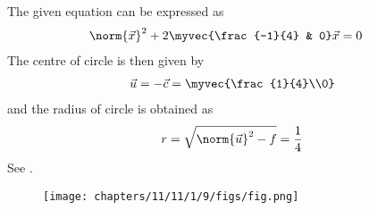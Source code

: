 The given equation can be expressed as 
\begin{align}
\norm{\vec{x}}^2+2\myvec{\frac{-1}{4} & 0}\vec{x}&=0
\end{align}	
The centre of circle is then given by 
\begin{align}
	\vec{u} = -\vec{c} 
=\myvec{\frac{1}{4}\\0}
\end{align}
and the radius of circle is obtained as
\begin{align}
	r=\sqrt{\norm{\vec{u}}^2 -f}
=\frac{1}{4}
\end{align}
See 
  .
\begin{figure}[H]
\texttt{[image: chapters/11/11/1/9/figs/fig.png]}
\caption{}
  \label{fig:chapters/11/11/1/9/Figure}
\end{figure}

